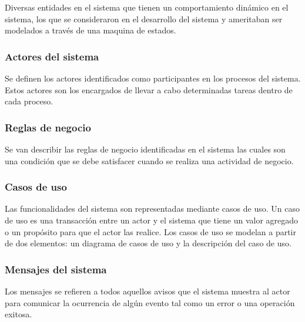 Diversas entidades en el sistema  que tienen un comportamiento dinámico en el sistema, 
los que se consideraron en el desarrollo del sistema y ameritaban ser modelados a través de una 
maquina de estados.\\

\subsubsection{Actores del sistema}
 Se definen los actores identificados como participantes en los procesos del sistema. 
 Estos actores son los encargados de llevar a cabo determinadas tareas dentro de cada proceso.\\
 
 \subsubsection{Reglas de negocio}

 Se van describir las reglas de negocio identificadas en el sistema las cuales son una condición que 
 se debe satisfacer cuando se realiza una actividad de negocio.\\
 
\subsubsection{Casos de uso}

Las funcionalidades del sistema son representadas mediante casos de uso. Un caso de uso es una transacción entre un actor y el sistema que tiene un valor agregado o un propósito para que el actor las realice. Los casos de uso se modelan a partir de dos elementos: un diagrama de casos de uso y la
descripción del caso de uso.\\

\subsubsection{Mensajes del sistema}

Los mensajes se refieren a todos aquellos avisos que el sistema muestra al actor para comunicar la ocurrencia de algún evento tal como un error o una operación exitosa. 


